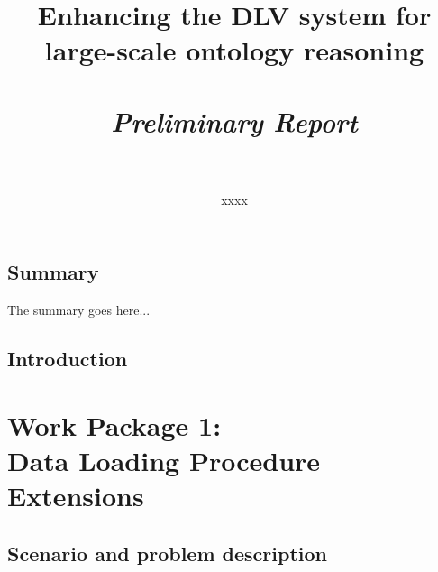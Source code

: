 \documentclass[oneside]{book}
\begin{document}
\title{\bf Enhancing the DLV system for\\large-scale ontology reasoning \\ \ \\
\Large \em Preliminary Report
\\ \ \\ }
\author{xxxx}

\maketitle


\chapter*{Summary}
The summary goes here...


\tableofcontents
\listoffigures
\listoftables


\chapter*{Introduction}





\part*{Work Package 1:\\Data Loading Procedure Extensions}

\chapter{Scenario and problem description}
\end{document}

